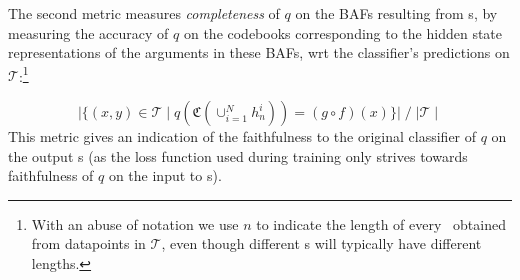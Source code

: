The second metric measures
\emph{completeness} of $q$ on the BAFs resulting from \FAXIC s, by measuring the 
accuracy of $q$ %
on
the codebooks corresponding to the hidden state representations of the arguments %
in these BAFs,  
wrt the classifier’s predictions on %
$\mathcal{T}$:\footnote{With an abuse of notation we use $n$ to indicate the length of every \FAXIC\ obtained from datapoints in $\mathcal{T}$, even though different \FAXIC s will typically have different lengths. %
}
\iffalse 
        \begin{align*}
           \frac{ %
           \Big| \{ (x, y) \in \mathcal{T} \mid q\left( \mathfrak{C} \left(\cup_{i=1}^N h^i_n \right) \right) = (g \circ f)(x) \} \Big|}{\mid \mathcal{T} \mid}
        \end{align*}
\fi 
\vspace*{-0.1cm}
\[ 
           \Big| \{ (x, y) \in \mathcal{T} \mid q\left( \mathfrak{C} \left(\cup_{i=1}^N h^i_n \right) \right) = (g \circ f)(x) \} \Big|
           \; /\;  {\mid \mathcal{T} \mid}
           \]
This metric gives an indication of the faithfulness to the original classifier of $q$ on the output \FAXIC s (as the loss function used during training  only strives towards faithfulness of $q$ on the input to  \FAXIC s).

        
        \iffalse we want faihfulness to the classifier, not the ground truth....
        
        \item Reliability: the accuracy of the FAX framework with respect to the ground truth labels
        \begin{align*}
            \frac{1}{\mid \mathcal{T} \mid} & \Big| \{ q \left( c \left( \cup_{i=0}^K h^i \right) \right) \mid q \left( p\left( \cup_{i=0}^K h^i \right) \right) \\
            & = y, \, \forall \, (x, y) \in \mathcal{T} \}\Big|
        \end{align*}
        \fi

